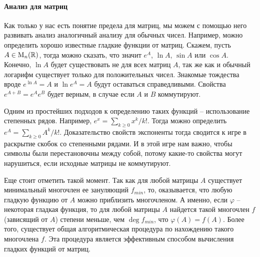 \paragraph{Анализ для матриц}

Как только у нас есть понятие предела для матриц, мы можем с помощью него развивать анализ аналогичный анализу для обычных чисел.
Например, можно определить хорошо известные гладкие функции от матриц.
Скажем, пусть $A\in\operatorname{M}_{n}(\mathbb R)$, тогда можно сказать, что значит $e^A$, $\ln A$, $\sin A$ или $\cos A$.
Конечно, $\ln A$ будет существовать не для всех матриц $A$, так же как и обычный логарифм существует только для положительных чисел.
Знакомые тождества вроде $e^{\ln A} = A$ и $\ln e^A = A$ будут оставаться справедливыми.
Свойства $e^{A+B}= e^A e^B$ будет верным, в случае если $A$ и $B$ коммутируют.

Одним из простейших подходов к определению таких функций -- использование степенных рядов.
Например, $e^x = \sum_{k\geqslant 0} x^k/k!$.
Тогда можно определить $e^A = \sum_{k\geqslant 0} A^k/k!$.
Доказательство свойств экспоненты тогда сводится к игре в раскрытие скобок со степенными рядами.
И в этой игре нам важно, чтобы символы были перестановочны между собой, потому какие-то свойства могут нарушиться, если исходные матрицы не коммутируют.

Еще стоит отметить такой момент.
Так как для любой матрицы $A$ существует минимальный многочлен ее зануляющий $f_{min}$, то, оказывается, что любую гладкую функцию от $A$ можно приблизить многочленом.
А именно, если $\varphi$ -- некоторая гладкая функция, то для любой матрицы $A$ найдется такой многочлен $f$ (зависящий от $A$) степени меньше, чем $\deg f_{min}$, что $\varphi(A) = f(A)$.
Более того, существует общая алгоритмическая процедура по нахождению такого многочлена $f$.
Эта процедура является эффективным способом вычисления гладких функций от матриц.
